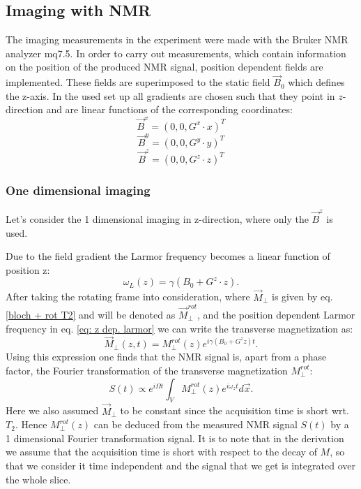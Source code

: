 \subsection{Imaging with NMR}
The imaging measurements in the experiment were made with the Bruker NMR analyzer mq7.5. 
In order to carry out measurements, which contain information on the position of the produced NMR signal, position dependent fields are implemented. These fields are superimposed to the static field $\vec{B}_0$ which defines the z-axis. In the used set up all gradients are chosen such that they point in $z$-direction and are linear functions of the corresponding coordinates:
$$\vec{B}^x = (0,0,G^x\cdot x)^T$$
$$\vec{B}^y = (0,0,G^y\cdot y)^T$$
$$\vec{B}^z = (0,0,G^z\cdot z)^T$$
\subsubsection{One dimensional imaging}
Let's consider the  1 dimensional imaging in z-direction, where only the $\vec{B}^z$ is used.  

Due to the field gradient the Larmor frequency becomes a linear function of position z:
\begin{equation}
\label{eq: z dep. larmor}
\omega_L(z) = \gamma(B_0 + G^z\cdot z).
\end{equation}
After taking the rotating frame into consideration, where $\vec{M}_\perp$ is given by eq. \ref{bloch + rot T2} and will be denoted as $\vec{M}_\perp^{rot}$, and the position dependent Larmor frequency in eq. \ref{eq: z dep. larmor} we can write the transverse magnetization as:
\begin{equation}
\vec{M}_\perp(z, t) = M_\perp^{rot}(z)e^{i\gamma(B_0 + G^{z}z)t}.
\end{equation}
Using this expression one finds that the NMR signal is, apart from a phase factor, the Fourier transformation of the transverse magnetization $M_\perp^{rot}$:
\begin{equation}
S(t)\propto e^{i\Omega t} \int_{V} M_\perp^{rot}(z) e^{i\omega_z t} d\vec{x}.
\end{equation}
Here we also assumed $\vec{M}_\perp$ to be constant since the acquisition time is short wrt. $T_2$. Hence $M_\perp^{rot}(z)$ can be deduced from the measured NMR signal $S(t)$ by a 1 dimensional Fourier transformation signal. It is to note that in the derivation we assume that the acquisition time is short with respect to the decay of $M$, so that we consider it time independent and the signal that we get is integrated over the whole slice.

